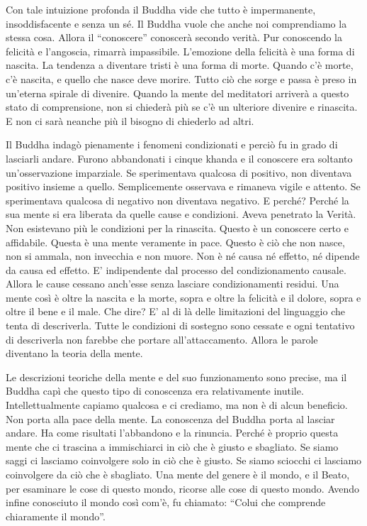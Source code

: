 Con tale intuizione profonda il Buddha vide che tutto è impermanente,
insoddisfacente e senza un sé. Il Buddha vuole che anche noi
comprendiamo la stessa cosa. Allora il ``conoscere'' conoscerà secondo
verità. Pur conoscendo la felicità e l'angoscia, rimarrà impassibile.
L'emozione della felicità è una forma di nascita. La tendenza a
diventare tristi è una forma di morte. Quando c'è morte, c'è nascita, e
quello che nasce deve morire. Tutto ciò che sorge e passa è preso in
un'eterna spirale di divenire. Quando la mente del meditatori arriverà a
questo stato di comprensione, non si chiederà più se c'è un ulteriore
divenire e rinascita. E non ci sarà neanche più il bisogno di chiederlo
ad altri.

Il Buddha indagò pienamente i fenomeni condizionati e perciò fu in grado
di lasciarli andare. Furono abbandonati i cinque khanda e il conoscere
era soltanto un'osservazione imparziale. Se sperimentava qualcosa di
positivo, non diventava positivo insieme a quello. Semplicemente
osservava e rimaneva vigile e attento. Se sperimentava qualcosa di
negativo non diventava negativo. E perché? Perché la sua mente si era
liberata da quelle cause e condizioni. Aveva penetrato la Verità. Non
esistevano più le condizioni per la rinascita. Questo è un conoscere
certo e affidabile. Questa è una mente veramente in pace. Questo è ciò
che non nasce, non si ammala, non invecchia e non muore. Non è né causa
né effetto, né dipende da causa ed effetto. E' indipendente dal processo
del condizionamento causale. Allora le cause cessano anch'esse senza
lasciare condizionamenti residui. Una mente così è oltre la nascita e la
morte, sopra e oltre la felicità e il dolore, sopra e oltre il bene e il
male. Che dire? E' al di là delle limitazioni del linguaggio che tenta
di descriverla. Tutte le condizioni di sostegno sono cessate e ogni
tentativo di descriverla non farebbe che portare all'attaccamento.
Allora le parole diventano la teoria della mente.

Le descrizioni teoriche della mente e del suo funzionamento sono
precise, ma il Buddha capì che questo tipo di conoscenza era
relativamente inutile. Intellettualmente capiamo qualcosa e ci crediamo,
ma non è di alcun beneficio. Non porta alla pace della mente. La
conoscenza del Buddha porta al lasciar andare. Ha come risultati
l'abbandono e la rinuncia. Perché è proprio questa mente che ci trascina
a immischiarci in ciò che è giusto e sbagliato. Se siamo saggi ci
lasciamo coinvolgere solo in ciò che è giusto. Se siamo sciocchi ci
lasciamo coinvolgere da ciò che è sbagliato. Una mente del genere è il
mondo, e il Beato, per esaminare le cose di questo mondo, ricorse alle
cose di questo mondo. Avendo infine conosciuto il mondo così com'è, fu
chiamato: ``Colui che comprende chiaramente il mondo''.

